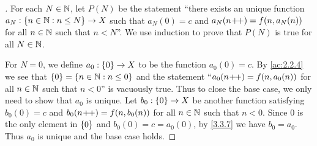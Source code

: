 \begin{proof}[]
	For each \(N \in \mathbb{N}\), let \(P(N)\) be the statement ``there exists an unique function \(a_N : \left\lbrace n \in \mathbb{N} : n \leq N\right\rbrace \to X\) such that \(a_N(0) = c\) and \(a_N(n\!+\!\!+) = f(n, a_N(n))\) for all \(n \in \mathbb{N}\) such that \(n < N\)''.
	We use induction to prove that \(P(N)\) is true for all \(N \in \mathbb{N}\).

	For \(N = 0\), we define \(a_0 : \left\lbrace0\right\rbrace \to X\) to be the function \(a_0(0) = c\).
	By \cref{ac:2.2.4} we see that \(\left\lbrace0\right\rbrace = \left\lbrace n \in \mathbb{N} : n \leq 0\right\rbrace\) and the statement ``\(a_0(n\!+\!\!+) = f(n, a_0(n))\) for all \(n \in \mathbb{N}\) such that \(n < 0\)'' is vacuously true.
	Thus to close the base case, we only need to show that \(a_0\) is unique.
	Let \(b_0 : \left\lbrace0\right\rbrace \to X\) be another function satisfying \(b_0(0) = c\) and \(b_0(n\!+\!\!+) = f(n, b_0(n))\) for all \(n \in \mathbb{N}\) such that \(n < 0\).
	Since \(0\) is the only element in \(\left\lbrace0\right\rbrace\) and \(b_0(0) = c = a_0(0)\), by \cref{3.3.7} we have \(b_0 = a_0\).
	Thus \(a_0\) is unique and the base case holds.


\end{proof}
